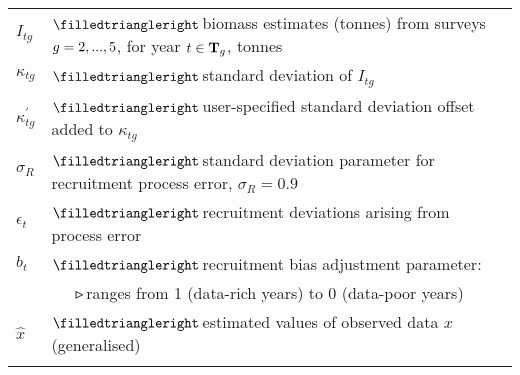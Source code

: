 \documentclass[11pt]{book}
\newcommand{\mbull}{$\filledtriangleright$\,}
\newcommand{\nbull}{~~~$\smalltriangleright$\,}
\begin{document}
\begin{longtable}{L{1.00in}L{5.5in}}
$I_{tg}$              & \mbull biomass estimates (tonnes) from surveys $g = 2,...,5$, for year $t \in {\bf T}_g$, tonnes\\
$\kappa_{tg}$         & \mbull standard deviation of $I_{tg}$\\
$\kappa_{tg}^\prime$  & \mbull user-specified standard deviation offset added to $\kappa_{tg}$\\
$\sigma_R$            & \mbull standard deviation parameter for recruitment process error, $\sigma_R = 0.9$\\
$\epsilon_t$          & \mbull recruitment deviations arising from process error\\
$b_t$                 & \mbull recruitment bias adjustment parameter:\\
                      & \nbull ranges from 1 (data-rich years) to 0 (data-poor years)\\
$\widehat{x}$       & \mbull estimated values of observed data $x$ (generalised)\\
\\[-.5ex]



\end{longtable}
\end{document}
